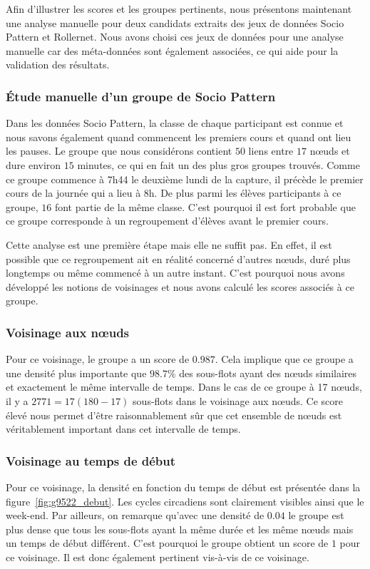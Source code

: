 
\bigskip

Afin d'illustrer les scores et les groupes pertinents, nous présentons maintenant une analyse manuelle pour deux candidats extraits des jeux de données Socio Pattern et Rollernet.
Nous avons choisi ces jeux de données pour une analyse manuelle car des méta-données sont également associées, ce qui aide pour la validation des résultats.

\subsubsection{Étude manuelle d'un groupe de Socio Pattern}
Dans les données Socio Pattern, la classe de chaque participant est connue et nous savons également quand commencent les premiers cours et quand ont lieu les pauses.
Le groupe que nous considérons contient $50$ liens entre $17$ n\oe{}uds et dure environ $15$ minutes, ce qui en fait un des plus gros groupes trouvés.
Comme ce groupe commence à 7h44 le deuxième lundi de la capture, il précède le premier cours de la journée qui a lieu à 8h.
De plus parmi les élèves participants à ce groupe, $16$ font partie de la même classe.
C'est pourquoi il est fort probable que ce groupe corresponde à un regroupement d'élèves avant le premier cours.

Cette analyse est une première étape mais elle ne suffit pas.
En effet, il est possible que ce regroupement ait en réalité concerné d'autres n\oe{}uds, duré plus longtemps ou même commencé à un autre instant.
C'est pourquoi nous avons développé les notions de voisinages et nous avons calculé les scores associés à ce groupe.

\subsubsection*{Voisinage aux n\oe{}uds}
Pour ce voisinage, le groupe a un score de $0.987$.
Cela implique que ce groupe a une densité plus importante que $98.7\%$ des sous-flots ayant des n\oe{}uds similaires et exactement le même intervalle de temps.
Dans le cas de ce groupe à 17 n\oe{}uds, il y a $2771=17(180-17)$ sous-flots dans le voisinage aux n\oe{}uds.
Ce score élevé nous permet d'être raisonnablement sûr que cet ensemble de n\oe{}uds est véritablement important dans cet intervalle de temps.

\subsubsection*{Voisinage au temps de début}
Pour ce voisinage, la densité en fonction du temps de début est présentée dans la figure~\ref{fig:g9522_debut}.
Les cycles circadiens sont clairement visibles ainsi que le week-end.
Par ailleurs, on remarque qu'avec une densité de $0.04$ le groupe est plus dense que tous les sous-flots ayant la même durée et les même n\oe{}uds mais un temps de début différent.
C'est pourquoi le groupe obtient un score de $1$ pour ce voisinage.
Il est donc également pertinent vis-à-vis de ce voisinage.

